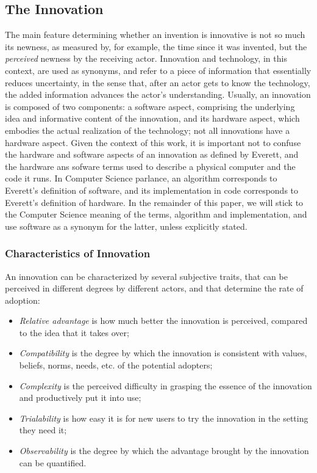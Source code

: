 \documentclass[12pt]{article}
\begin{document}
\subsection{The Innovation}
\label{sec:orgd0f9b0f}
The main feature determining whether an invention is innovative is not so much its newness, as measured by, for example, the time since it was invented, but the \emph{perceived} newness by the receiving actor. Innovation and technology, in this context, are used as synonyms, and refer to a piece of information that essentially reduces uncertainty, in the sense that, after an actor gets to know the technology, the added information advances the actor's understanding. Usually, an innovation is composed of two components: a software aspect, comprising the underlying idea and informative content of the innovation, and its hardware aspect, which embodies the actual realization of the technology; not all innovations have a hardware aspect. Given the context of this work, it is important not to confuse the hardware and software aspects of an innovation as defined by Everett, and the hardware ans sofware terms used to describe a physical computer and the code it runs. In Computer Science parlance, an algorithm corresponds to Everett's definition of software, and its implementation in code corresponds to Everett's definition of hardware. In the remainder of this paper, we will stick to the Computer Science meaning of the terms, algorithm and implementation, and use software as a synonym for the latter, unless explicitly stated.

\subsubsection{Characteristics of Innovation}
\label{sec:org6b87559}
An innovation can be characterized by several subjective traits, that can be perceived in different degrees by different actors, and that determine the rate of adoption:

\begin{itemize}
\item \emph{Relative advantage} is how much better the innovation is perceived, compared to the idea that it takes over;
\item \emph{Compatibility} is the degree by which the innovation is consistent with values, beliefs, norms, needs, etc. of the potential adopters;
\item \emph{Complexity} is the perceived difficulty in grasping the essence of the innovation and productively put it into use;
\item \emph{Trialability} is how easy it is for new users to try the innovation in the setting they need it;
\item \emph{Observability} is the degree by which the advantage brought by the innovation can be quantified.
\end{itemize}
\end{document}
